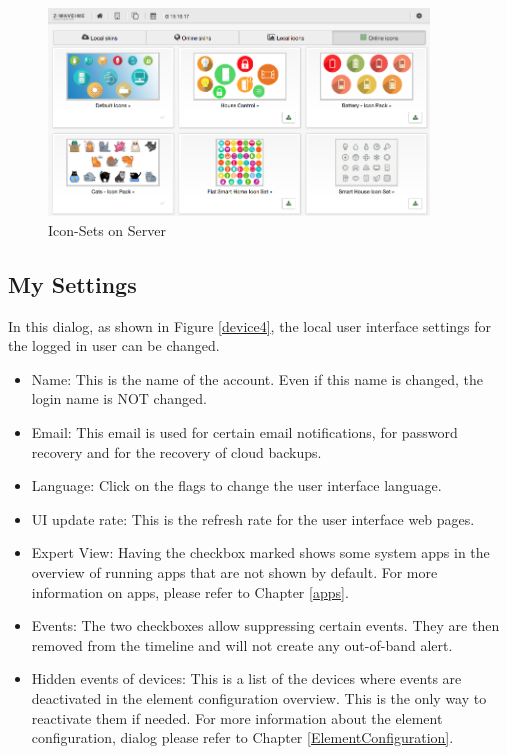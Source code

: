 \begin{figure}
\begin{center}
\includegraphics[width=0.9\textwidth]{pngs/cap4/shui84.png}
\caption{Icon-Sets on Server}
\label{shui84}
\end{center}
\end{figure}

\subsection{My Settings}
\label{mysettings}

In this dialog, as shown in Figure \ref{device4}, the local user interface settings for 
the logged in user can be changed.

\begin{itemize}
\item Name: This is the name of the account. Even if this name is changed, the login name is NOT changed.
\item Email: This email is used for certain email notifications, for password recovery and for the recovery of cloud backups.
\item Language: Click on the flags to change the user interface language.
\item UI update rate: This is the refresh rate for the user interface web pages.
\item Expert View: Having the checkbox marked shows some system apps in the overview of 
running apps that are not shown by default. For more information on apps, please refer 
to Chapter \ref{apps}.
\item Events: The two checkboxes allow suppressing certain events. They are then removed 
from the timeline and will not create any out-of-band alert.
\item Hidden events of devices:  This 
is a list of the devices where events are deactivated in the element configuration overview. 
This is the only way to reactivate them if needed. For more information about the element 
configuration, dialog please refer to Chapter \ref{ElementConfiguration}.
\end{itemize}

